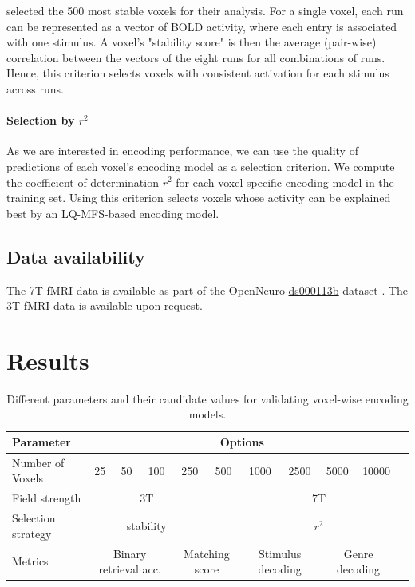 \citet{ML08} selected the 500 most stable voxels for their analysis. For a single voxel, each run can be represented as a vector of BOLD activity, where each entry is associated with one stimulus. A voxel's "stability score" is then the average (pair-wise) correlation between the vectors of the eight runs for all combinations of runs. Hence, this criterion selects voxels with consistent activation for each stimulus across runs.

\paragraph{Selection by $r^2$}

As we are interested in encoding performance, we can use the quality of predictions of each voxel's encoding model as a selection criterion. We compute the coefficient of determination $r^2$ for each voxel-specific encoding model in the training set. Using this criterion selects voxels whose activity can be explained best by an LQ-MFS-based encoding model.



\subsection*{Data availability}

The 7T f{MRI} data is available as part of the OpenNeuro \href{https://openneuro.org/datasets/ds000113/versions/1.3.0}{ds000113b} dataset \citep{ds113b}.
The 3T f{MRI} data is available upon request.

\section*{Results}

\noindent
\begin{table}[!htbp]
\centering
\begin{adjustbox}{center}
\begin{tabular}{lcccccccccc}
\hline
Parameter &   \multicolumn{9}{c}{Options}  \tabularnewline
\hline
Number of Voxels & 25 & 50 & 100 & 250 & 500 & 1000 & 2500 & 5000 & 10000 \\
Field strength            & \multicolumn{4}{c}{3T} & & \multicolumn{4}{c}{7T}  &   \\
Selection strategy & \multicolumn{4}{c}{stability} & & \multicolumn{4}{c}{$r^{2}$} \\
Metrics & \multicolumn{3}{c}{Binary retrieval acc.} & \multicolumn{2}{c}{Matching score} & \multicolumn{2}{c}{Stimulus decoding} & \multicolumn{2}{c}{Genre decoding} \\
\hline
\end{tabular}
\end{adjustbox}
\caption{Different parameters and their candidate values for validating voxel-wise encoding models.}
\label{table:parameters}
\end{table}


